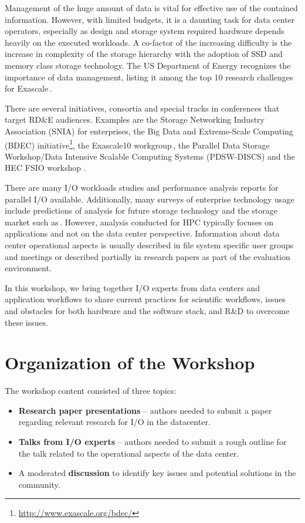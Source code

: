 \documentclass{llncs}
\begin{document}
Management of the huge amount of data is vital for effective use of the contained information. However, with limited budgets, it is a daunting task for data center operators,
especially as design and storage system required hardware depends heavily on the executed workloads.
A co-factor of the increasing difficulty is the increase in complexity of the storage hierarchy with the adoption of SSD and memory class storage technology.
The US Department of Energy recognizes the importance of data management, listing it among the top 10 research challenges for Exascale\,\cite{top14}. %

There are several initiatives, consortia and special tracks in conferences that target RD\&E audiences.
Examples are the Storage Networking Industry Association (SNIA) for enterprises, the
Big Data and Extreme-Scale Computing (BDEC) initiative\footnote{\url{http://www.exascale.org/bdec/}}, the
Exascale10 workgroup\,\cite{brinkmann14}, the Parallel Data Storage Workshop/Data Intensive Scalable Computing Systems
(PDSW-DISCS) and the HEC FSIO workshop \cite{bancroft2009}.

There are many I/O workloads studies and performance analysis reports for parallel I/O available.
Additionally, many surveys of enterprise technology usage include predictions of analysis for future storage technology and the storage market such as\,\cite{idc1}.
However, analysis conducted for HPC typically focuses on applications and not on the data center perspective.
Information about data center operational aspects is usually described in file system specific user groups and meetings or described partially in research papers as part of the evaluation environment.

In this workshop, we bring together I/O experts from data centers and application workflows to share current practices for scientific workflows, issues and obstacles for both hardware and the software stack, and R\&D to overcome these issues.


\section{Organization of the Workshop}

\noindent The workshop content consisted of three topics:
\begin{itemize}
  \item \textbf{Research paper presentations} -- authors needed to submit a paper regarding relevant research for I/O in the datacenter.
  \item \textbf{Talks from I/O experts} -- authors needed to submit a rough outline for the talk related to the operational aspects of the data center.
  \item A moderated \textbf{discussion} to identify key issues and potential solutions in the community.
\end{itemize}
\end{document}
